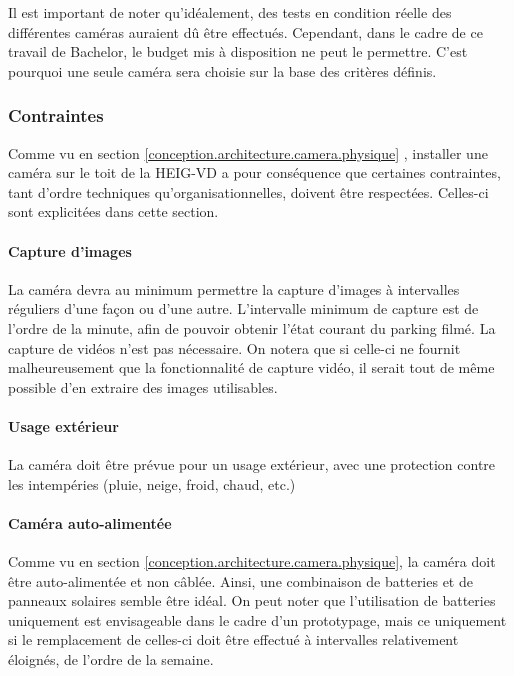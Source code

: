 Il est important de noter qu'idéalement, des tests en condition réelle des différentes caméras auraient dû être effectués. Cependant, dans le cadre de ce travail de Bachelor, le budget mis à disposition ne peut le permettre. C'est pourquoi une seule caméra sera choisie sur la base des critères définis.

\subsubsection{Contraintes}\label{conception.techno.camera.contraintes}
Comme vu en section \ref{conception.architecture.camera.physique} , installer une caméra sur le toit de la HEIG-VD a pour conséquence que certaines contraintes, tant d'ordre techniques qu'organisationnelles, doivent être respectées. Celles-ci sont explicitées dans cette section.

\paragraph{Capture d'images}
La caméra devra au minimum permettre la capture d'images à intervalles réguliers d'une façon ou d'une autre. L'intervalle minimum de capture est de l'ordre de la minute, afin de pouvoir obtenir l'état courant du parking filmé. La capture de vidéos n'est pas nécessaire. On notera que si celle-ci ne fournit malheureusement que la fonctionnalité de capture vidéo, il serait tout de même possible d'en extraire des images utilisables. 

\paragraph{Usage extérieur}
La caméra doit être prévue pour un usage extérieur, avec une protection contre les intempéries (pluie, neige, froid, chaud, etc.)

\paragraph{Caméra auto-alimentée}
Comme vu en section \ref{conception.architecture.camera.physique}, la caméra doit être auto-alimentée et non câblée. Ainsi, une combinaison de batteries et de panneaux solaires semble être idéal. On peut noter que l'utilisation de batteries uniquement est envisageable dans le cadre d'un prototypage, mais ce uniquement si le remplacement de celles-ci doit être effectué à intervalles relativement éloignés, de l'ordre de la semaine.

